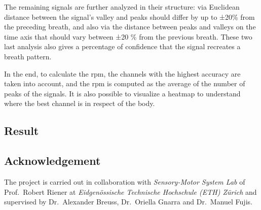 \documentclass[a4paper,11pt, oneside,italian]{article}
\begin{document}
The remaining signals are further analyzed in their structure: via Euclidean distance between the signal's valley and peaks should differ by up to ±20$\%$ from the preceding breath, and also via the distance between peaks and valleys on the time axis that should vary between ±20 \% from the previous breath.
These two last analysis also gives a percentage of confidence that the signal recreates a breath pattern.

In the end, to calculate the rpm, the channels with the highest accuracy are taken into account, and the rpm is computed as the average of the number of peaks of the signals.
It is also possible to visualize a heatmap to understand where the best channel is in respect of the body. 


\subsection*{Result}

\subsection*{Acknowledgement}
The project is carried out in collaboration with \textit{Sensory-Motor System Lab} of Prof.~Robert Riener at \textit{Eidgenössische Technische Hochschule 
(ETH) Zürich} and supervised by Dr.~Alexander Breuss, Dr.~Oriella Gnarra and Dr.~Manuel Fujis.
\end{document}
